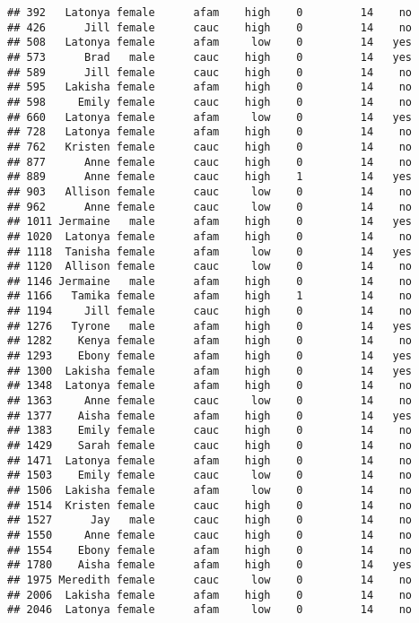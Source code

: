 \documentclass[
]{article}
\begin{document}
\begin{verbatim}
## 392   Latonya female      afam    high    0         14    no
## 426      Jill female      cauc    high    0         14    no
## 508   Latonya female      afam     low    0         14   yes
## 573      Brad   male      cauc    high    0         14   yes
## 589      Jill female      cauc    high    0         14    no
## 595   Lakisha female      afam    high    0         14    no
## 598     Emily female      cauc    high    0         14    no
## 660   Latonya female      afam     low    0         14   yes
## 728   Latonya female      afam    high    0         14    no
## 762   Kristen female      cauc    high    0         14    no
## 877      Anne female      cauc    high    0         14    no
## 889      Anne female      cauc    high    1         14   yes
## 903   Allison female      cauc     low    0         14    no
## 962      Anne female      cauc     low    0         14    no
## 1011 Jermaine   male      afam    high    0         14   yes
## 1020  Latonya female      afam    high    0         14    no
## 1118  Tanisha female      afam     low    0         14   yes
## 1120  Allison female      cauc     low    0         14    no
## 1146 Jermaine   male      afam    high    0         14    no
## 1166   Tamika female      afam    high    1         14    no
## 1194     Jill female      cauc    high    0         14    no
## 1276   Tyrone   male      afam    high    0         14   yes
## 1282    Kenya female      afam    high    0         14    no
## 1293    Ebony female      afam    high    0         14   yes
## 1300  Lakisha female      afam    high    0         14   yes
## 1348  Latonya female      afam    high    0         14    no
## 1363     Anne female      cauc     low    0         14    no
## 1377    Aisha female      afam    high    0         14   yes
## 1383    Emily female      cauc    high    0         14    no
## 1429    Sarah female      cauc    high    0         14    no
## 1471  Latonya female      afam    high    0         14    no
## 1503    Emily female      cauc     low    0         14    no
## 1506  Lakisha female      afam     low    0         14    no
## 1514  Kristen female      cauc    high    0         14    no
## 1527      Jay   male      cauc    high    0         14    no
## 1550     Anne female      cauc    high    0         14    no
## 1554    Ebony female      afam    high    0         14    no
## 1780    Aisha female      afam    high    0         14   yes
## 1975 Meredith female      cauc     low    0         14    no
## 2006  Lakisha female      afam    high    0         14    no
## 2046  Latonya female      afam     low    0         14    no

\end{verbatim}
\end{document}
